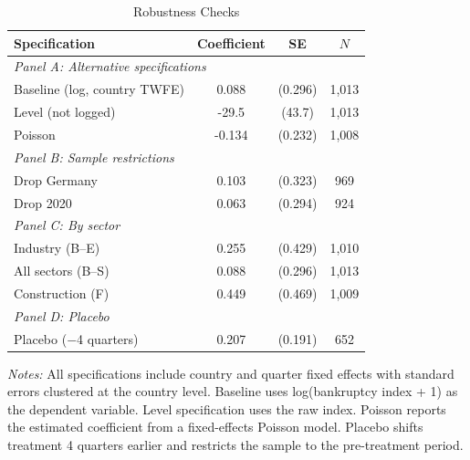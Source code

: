 \begin{table}[t]
\centering
\caption{Robustness Checks}
\label{tab:robustness}
\begin{tabular}{lccc}
\hline\hline
Specification & Coefficient & SE & $N$ \\
\hline
\multicolumn{4}{l}{\textit{Panel A: Alternative specifications}} \\
Baseline (log, country TWFE) & 0.088 & (0.296) & 1,013 \\
Level (not logged) & -29.5 & (43.7) & 1,013 \\
Poisson & -0.134 & (0.232) & 1,008 \\
\hline
\multicolumn{4}{l}{\textit{Panel B: Sample restrictions}} \\
Drop Germany & 0.103 & (0.323) & 969 \\
Drop 2020 & 0.063 & (0.294) & 924 \\
\hline
\multicolumn{4}{l}{\textit{Panel C: By sector}} \\
Industry (B--E) & 0.255 & (0.429) & 1,010 \\
All sectors (B--S) & 0.088 & (0.296) & 1,013 \\
Construction (F) & 0.449 & (0.469) & 1,009 \\
\hline
\multicolumn{4}{l}{\textit{Panel D: Placebo}} \\
Placebo ($-$4 quarters) & 0.207 & (0.191) & 652 \\
\hline\hline
\end{tabular}
\begin{minipage}{0.88\textwidth}
\vspace{0.3em}
\footnotesize \textit{Notes:} All specifications include country and quarter fixed effects with standard errors clustered at the country level. Baseline uses log(bankruptcy index + 1) as the dependent variable. Level specification uses the raw index. Poisson reports the estimated coefficient from a fixed-effects Poisson model. Placebo shifts treatment 4 quarters earlier and restricts the sample to the pre-treatment period.
\end{minipage}
\end{table}
